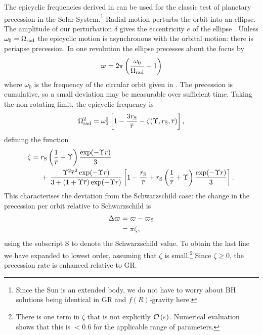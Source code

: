 The epicyclic frequencies derived in  can be used for the classic test of planetary precession in the Solar System.\footnote{Since the Sun is an extended body, we do not have to worry about BH solutions being identical in GR and $f(R)$-gravity here.} Radial motion perturbs the orbit into an ellipse. The amplitude of our perturbation $\delta$ gives the eccentricity $e$ of the ellipse \citep{Kerner2001a}. Unless $\omega_0 = \Omega_\mathrm{rad}$ the epicyclic motion is asynchronous with the orbital motion: there is periapse precession. In one revolution the ellipse precesses about the focus by
\begin{equation}
\varpi = 2\pi\left(\frac{\omega_0}{\Omega_\mathrm{rad}} - 1\right)
\end{equation}
where $\omega_0$ is the frequency of the circular orbit given in . The precession is cumulative, so a small deviation may be measurable over sufficient time. Taking the non-rotating limit, the epicyclic frequency is
\begin{equation}
\Omega_\mathrm{rad}^2 = \omega_0^2 \left[1 - \frac{3r_\mathrm{S}}{\overline{r}} - \zeta(\Upsilon,r_\mathrm{S},\overline{r})\right],
\end{equation}
defining the function
\begin{align}
\zeta = {} & r\sub{S}\left(\recip{\overline{r}} + \Upsilon\right)\frac{\exp(-\Upsilon r)}{3} \nonumber\\* %
 {} & + \left. \frac{\Upsilon^2\overline{r}^2\exp(-\Upsilon r)}{3 + (1 + \Upsilon \overline{r})\exp(-\Upsilon r)} \left[1 - \frac{r\sub{S}}{\overline{r}} + r\sub{S}\left(\recip{\overline{r}} + \Upsilon\right)\frac{\exp(-\Upsilon r)}{3}\right].\right.
\end{align}
This characterises the deviation from the Schwarzschild case: the change in the precession per orbit relative to Schwarzschild is
\begin{align}
\Delta \varpi = {} & \varpi - \varpi_\mathrm{S} \\
 = {} & \pi\zeta,
\end{align}
using the subscript $\text{S}$ to denote the Schwarzschild value. To obtain the last line we have expanded to lowest order, assuming that $\zeta$ is small.\footnote{There is one term in $\zeta$ that is not explicitly $\mathcal{O}\left({\varepsilon}\right)$. Numerical evaluation shows that this is $< 0.6$ for the applicable range of parameters.} Since $\zeta \geq 0$, the precession rate is enhanced relative to GR.

